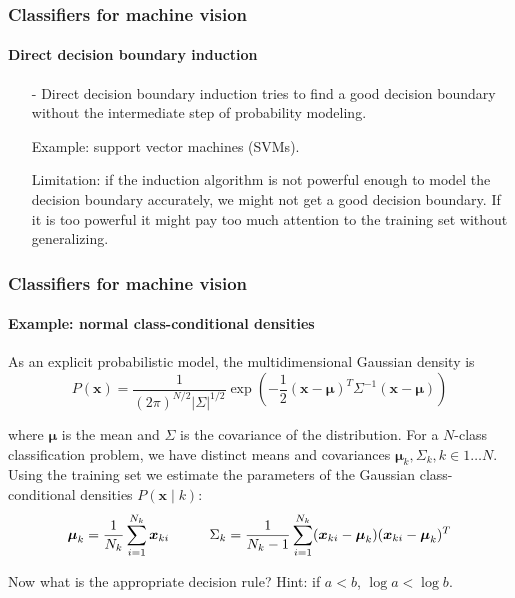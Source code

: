 \documentclass[aspectratio=169]{beamer}
\renewcommand{\vec}[1]{\boldsymbol{#1}}
\begin{document}
\begin{frame}
\frametitle{Classifiers for machine vision}
\framesubtitle{Direct decision boundary induction}

\begin{itemize}
\item[-] \alert{Direct decision boundary induction} tries to find a
  good decision boundary without the intermediate step of probability
  modeling.

  \smallskip
  Example: support vector machines (SVMs).

  \smallskip
  Limitation: if the induction algorithm is not powerful enough to
  model the decision boundary accurately, we might not get a good
  decision boundary.  If it is \alert{too powerful} it might pay too
  much attention to the training set without generalizing.
\end{itemize}

\end{frame}

\begin{frame}
\frametitle{Classifiers for machine vision}
\framesubtitle{Example: normal class-conditional densities}

As an explicit probabilistic model, the \alert{multidimensional
  Gaussian density} is
\[ P(\vec{x}) = \frac{1}{(2 \pi)^{N/2}|\Sigma|^{1/2}} \exp \left(
  -\frac{1}{2} (\vec{x}-\vec{\mu})^T \Sigma^{-1} (\vec{x}-\vec{\mu})
\right) \]

where $\vec{\mu}$ is the mean and $\Sigma$ is the covariance of the
distribution.  For a $N$-class classification problem, we have
distinct means and covariances $\vec{\mu}_k, \Sigma_k, k \in 1\ldots
N$.  Using the training set we estimate the parameters of the Gaussian
class-conditional densities $P(\vec{x} \mid k)$:
\[ \vec{\mu}_k = \frac{1}{N_k} \sum_{i=1}^{N_k} \vec{x}_{ki}
\mbox{\hspace{0.4in}}
   \Sigma_k = \frac{1}{N_k-1} \sum_{i=1}^{N_k} (
   \vec{x}_{ki}-\vec{\mu}_k) (\vec{x}_{ki}-\vec{\mu}_k)^T \]

Now what is the appropriate decision rule?  Hint: if $a<b$, $\log a <
\log b$.

\end{frame}
\end{document}
